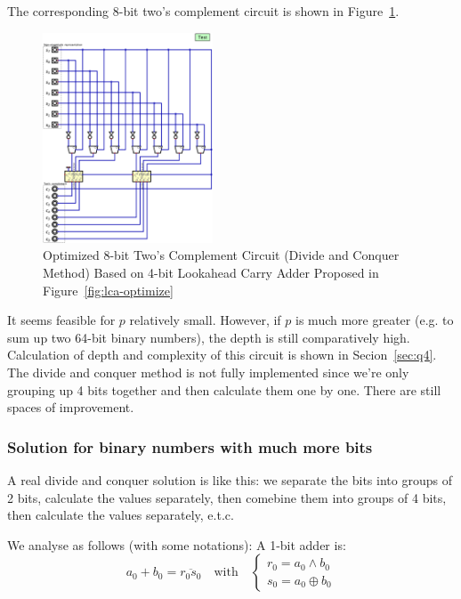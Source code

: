 \documentclass[conference]{IEEEtran}
\begin{document}
The corresponding 8-bit two's complement circuit is shown in Figure~\ref{fig:tc-dq-optimize}.


\begin{figure}[h!]
    \centering
    \includegraphics[width=0.45\textwidth]{assets/twos_complement_dq_copy.png}
    \caption{Optimized 8-bit Two's Complement Circuit (Divide and Conquer Method) Based on 4-bit Lookahead Carry Adder Proposed in Figure~\ref{fig:lca-optimize}}
    \label{fig:tc-dq-optimize}
    \end{figure}
It seems feasible for $p$ relatively small. However, if $p$ is much more greater (e.g. to sum up two 64-bit binary numbers), the depth is still
comparatively high. Calculation of depth and complexity of this circuit is shown in Secion~\ref{sec:q4}. The divide and conquer method is not fully implemented since we're only grouping up 4 bits together and then calculate them one by one. There are still spaces of improvement.


\subsubsection{Solution for binary numbers with much more bits}

A real divide and conquer solution is like this: we separate the bits into groups of 2 bits, calculate the values separately, then comebine them into groups of 4 bits, then calculate the values separately, e.t.c.

We analyse as follows (with some notations):
A 1-bit adder is: 
\begin{equation}
    a_0 + b_0 = \overline{r_0s_0} \quad \text{with}\quad \begin{cases}
        r_0 = a_0 \wedge b_0 \\
        s_0 = a_0 \oplus b_0
\end{cases}
\end{equation}
\end{document}
